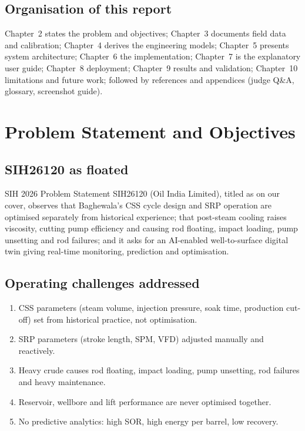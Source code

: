\documentclass[12pt,a4paper]{report}
\begin{document}
\section{Organisation of this report}
Chapter~2 states the problem and objectives; Chapter~3 documents field data and
calibration; Chapter~4 derives the engineering models; Chapter~5 presents
system architecture; Chapter~6 the implementation; Chapter~7 is the explanatory
user guide; Chapter~8 deployment; Chapter~9 results and validation;
Chapter~10 limitations and future work; followed by references and appendices
(judge Q\&A, glossary, screenshot guide).

\chapter{Problem Statement and Objectives}
\section{SIH26120 as floated}
SIH 2026 Problem Statement SIH26120 (Oil India Limited), titled as on our
cover, observes that Baghewala's CSS cycle design and SRP operation are
optimised separately from historical experience; that post-steam cooling raises
viscosity, cutting pump efficiency and causing rod floating, impact loading,
pump unsetting and rod failures; and it asks for an AI-enabled well-to-surface
digital twin giving real-time monitoring, prediction and optimisation.

\section{Operating challenges addressed}
\begin{enumerate}
  \item CSS parameters (steam volume, injection pressure, soak time,
    production cut-off) set from historical practice, not optimisation.
  \item SRP parameters (stroke length, SPM, VFD) adjusted manually and
    reactively.
  \item Heavy crude causes rod floating, impact loading, pump unsetting, rod
    failures and heavy maintenance.
  \item Reservoir, wellbore and lift performance are never optimised together.
  \item No predictive analytics: high SOR, high energy per barrel, low recovery.
\end{enumerate}
\end{document}
